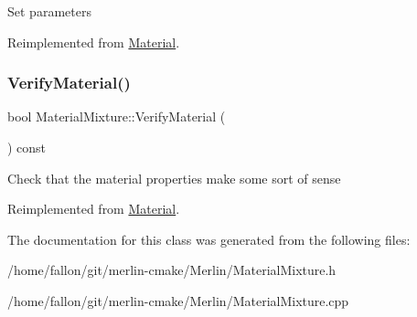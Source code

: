 Set parameters 

Reimplemented from \hyperlink{classMaterial}{Material}.

\mbox{\label{classMaterialMixture_a9361444da7bc84a876b0a94e1bdba907}} 
\subsubsection{\texorpdfstring{Verify\+Material()}{VerifyMaterial()}}
{\footnotesize\ttfamily bool Material\+Mixture\+::\+Verify\+Material (\begin{DoxyParamCaption}{ }\end{DoxyParamCaption}) const\hspace{0.3cm}{\ttfamily [virtual]}}

Check that the material properties make some sort of sense 

Reimplemented from \hyperlink{classMaterial}{Material}.



The documentation for this class was generated from the following files\+:\begin{DoxyCompactItemize}
\item 
/home/fallon/git/merlin-\/cmake/\+Merlin/Material\+Mixture.\+h\item 
/home/fallon/git/merlin-\/cmake/\+Merlin/Material\+Mixture.\+cpp\end{DoxyCompactItemize}
